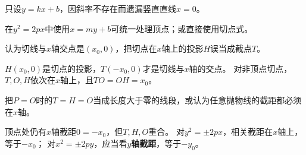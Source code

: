 \begin{trapbox}
    \medskip
    \begin{description}[style=nextline, leftmargin=2.8em, labelsep=0.5em, itemsep=0.38em]
        \item[\textbf{\textcolor{CTrap}{易错点五（设直线漏掉顶点）}}]
        只设$y=kx+b$，因斜率不存在而遗漏竖直直线$x=0$。
        \item[\textbf{\textcolor{CTrap}{正确理解：}}]
        在$y^2=2px$中使用$x=my+b$可统一处理顶点；或直接使用切点式。
    \end{description}


    \medskip
    \begin{description}[style=nextline, leftmargin=2.8em, labelsep=0.5em, itemsep=0.38em]
        \item[\textbf{\textcolor{CTrap}{易错点六（把截距误写成$x_0$）}}]
        认为切线与$x$轴交点是$(x_0,0)$，把切点在$x$轴上的投影$H$误当成截点$T$。
        \item[\textbf{\textcolor{CTrap}{正确理解：}}]
        $H(x_0,0)$是切点的投影，$T(-x_0,0)$才是切线与$x$轴的交点。
        对非顶点切点，$T,O,H$依次在$x$轴上，且$TO=OH=x_0$。
    \end{description}

    \medskip
    \begin{description}[style=nextline, leftmargin=2.8em, labelsep=0.5em, itemsep=0.38em]
        \item[\textbf{\textcolor{CTrap}{易错点七（忽略顶点与开口方向）}}]
        把$P=O$时的$T=H=O$当成长度大于零的线段，或认为任意抛物线的截距都必须在$x$轴。
        \item[\textbf{\textcolor{CTrap}{正确理解：}}]
        顶点处仍有$x$轴截距$0=-x_0$，但$T,H,O$重合。
        对$y^2=\pm2px$，相关截距在$x$轴上，等于$-x_0$；
        对$x^2=\pm2py$，应当看\textbf{$y$轴截距}，等于$-y_0$。
    \end{description}
\end{trapbox}
